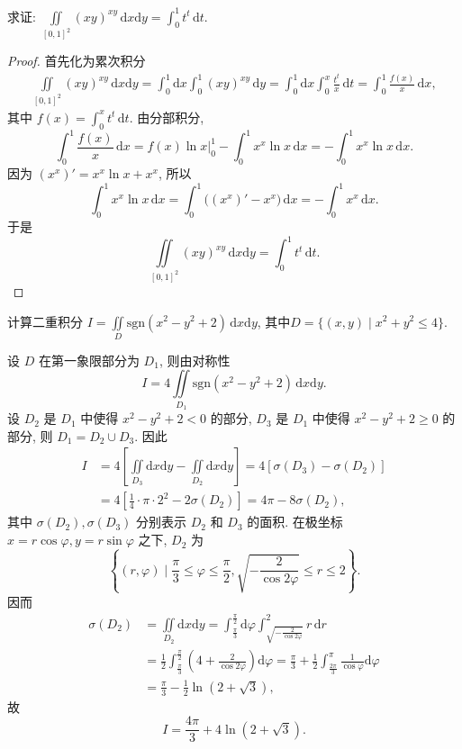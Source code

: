 \documentclass[../../main.tex]{subfiles}
\begin{document}
\begin{example}
求证: $\iint\limits_{[0,1]^2} (xy)^{xy} \, \mathrm{d}x\mathrm{d}y = \int_0^1 t^t \, \mathrm{d}t$.
\end{example}
\begin{proof}
首先化为累次积分
\begin{align*}
\iint\limits_{[0,1]^2} (xy)^{xy} \, \mathrm{d}x\mathrm{d}y = \int_0^1 \mathrm{d}x \int_0^1 (xy)^{xy} \, \mathrm{d}y = \int_0^1 \mathrm{d}x \int_0^x \frac{t^t}{x} \, \mathrm{d}t = \int_0^1 \frac{f(x)}{x} \, \mathrm{d}x,
\end{align*}
其中 $f(x) = \int_0^x t^t \, \mathrm{d}t$. 由分部积分,
\[
\int_0^1 \frac{f(x)}{x} \, \mathrm{d}x = f(x) \ln x \bigg|_0^1 - \int_0^1 x^x \ln x \, \mathrm{d}x = - \int_0^1 x^x \ln x \, \mathrm{d}x.
\]
因为 $(x^x)' = x^x \ln x + x^x$, 所以
\[
\int_0^1 x^x \ln x \, \mathrm{d}x = \int_0^1 \big( (x^x)' - x^x \big) \, \mathrm{d}x = - \int_0^1 x^x \, \mathrm{d}x.
\]
于是
\[
\iint\limits_{[0,1]^2} (xy)^{xy} \, \mathrm{d}x\mathrm{d}y = \int_0^1 t^t \, \mathrm{d}t.
\]
\end{proof}

\begin{example}
计算二重积分 \( I = \iint\limits_D \text{sgn}(x^2 - y^2 + 2) \, \mathrm{d}x\mathrm{d}y \), 其中$D = \{ (x,y) \mid x^2 + y^2 \leqslant 4 \}.$
\end{example}
\begin{solution}
设 \( D \) 在第一象限部分为 \( D_1 \), 则由对称性
\[
I = 4 \iint\limits_{D_1} \text{sgn}(x^2 - y^2 + 2) \, \mathrm{d}x\mathrm{d}y.
\]
设 \( D_2 \) 是 \( D_1 \) 中使得 \( x^2 - y^2 + 2 < 0 \) 的部分, \( D_3 \) 是 \( D_1 \) 中使得 \( x^2 - y^2 + 2 \geqslant 0 \) 的部分, 则 \( D_1 = D_2 \cup D_3 \). 因此
\begin{align*}
I &= 4 \left[ \iint\limits_{D_3} \mathrm{d}x\mathrm{d}y - \iint\limits_{D_2} \mathrm{d}x\mathrm{d}y \right] = 4 [\sigma(D_3) - \sigma(D_2)]
\\
&= 4 \left[ \frac{1}{4} \cdot \pi \cdot 2^2 - 2\sigma(D_2) \right] = 4\pi - 8\sigma(D_2),
\end{align*}
其中 \( \sigma(D_2), \sigma(D_3) \) 分别表示 \( D_2 \) 和 \( D_3 \) 的面积. 在极坐标 \( x = r\cos\varphi, y = r\sin\varphi \) 之下, \( D_2 \) 为
\[
\left\{ (r,\varphi) \mid \frac{\pi}{3} \leqslant \varphi \leqslant \frac{\pi}{2}, \sqrt{-\frac{2}{\cos 2\varphi}} \leqslant r \leqslant 2 \right\}.
\]
因而
\begin{align*}
\sigma(D_2) &= \iint\limits_{D_2} \mathrm{d}x\mathrm{d}y = \int_{\frac{\pi}{3}}^{\frac{\pi}{2}} \mathrm{d}\varphi \int_{\sqrt{-\frac{2}{\cos 2\varphi}}}^2 r \, \mathrm{d}r
\\
&= \frac{1}{2} \int_{\frac{\pi}{3}}^{\frac{\pi}{2}} \left( 4 + \frac{2}{\cos 2\varphi} \right) \mathrm{d}\varphi = \frac{\pi}{3} + \frac{1}{2} \int_{\frac{2\pi}{3}}^{\pi} \frac{1}{\cos\varphi} \mathrm{d}\varphi
\\
&= \frac{\pi}{3} - \frac{1}{2} \ln(2 + \sqrt{3}),
\end{align*}
故
\[
I = \frac{4\pi}{3} + 4\ln(2 + \sqrt{3}).
\]
\end{solution}
\end{document}
